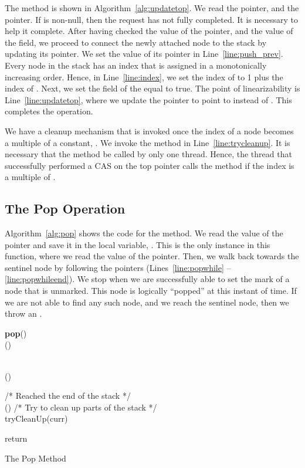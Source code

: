\documentclass{llncs}
\begin{document}
\vspace{-8mm}
\normalsize
The  method is shown in Algorithm~\ref{alg:updatetop}. We read the  pointer, and the  
pointer. If  is non-null, then the request has not fully completed. It is necessary to help it complete. 
After having checked the value of the  pointer, and the value of the  field, we proceed to connect 
the newly attached node to the stack by updating its  pointer. We set the value of its  pointer in 
Line~\ref{line:push_prev}. Every node in the stack has an index that is assigned in a monotonically increasing 
order. Hence, in Line~\ref{line:index}, we set the index of  to 1 plus the index of .
Next, we set the  field 
of the  equal to true. The point of
linearizability is Line~\ref{line:updatetop}, 
where we update the  pointer to point to  instead of
. This completes the  operation. 

We have a cleanup mechanism that is invoked once the index of a node becomes a multiple of a constant, . 
We invoke the  method in Line~\ref{line:trycleanup}. It is necessary that the  method
be called by only one thread.  Hence, the thread that successfully performed a CAS on the top pointer
calls the  method if the index is a multiple of . 

\vspace{-3mm} 
\subsection{The Pop Operation}
Algorithm~\ref{alg:pop} shows the code for the  method. We read the value of 
the  pointer and save it in the local variable, . This is the only instance
in this function, where we read the value of the  pointer. Then, we walk back
towards the sentinel node by following the  pointers (Lines~\ref{line:popwhile} --
\ref{line:popwhileend}). We stop when we are successfully able to set the mark of a node
that is unmarked. This node is logically ``popped'' at this instant of time. 
If we are not able to find any such node, and we reach the sentinel node, then we throw
an . 

\vspace{-6mm}
\begin{algorithm}[!htb]
\scriptsize
\SetAlgoLined

\textbf{pop}(){}\\
	    ()\\ \label{alg:prev_top}
	    \\
	\label{alg:while_mark}
	\While{  }  {  \label{line:popwhile} 
			   ()\\  
			\If{}
			{
				
			}
			   
	} \label{line:popwhileend}

	\If{}
	{
/* Reached the end of the stack */ \\
			  () 
	}
/* Try to clean up parts of the stack */ \\
	tryCleanUp(curr) \label{line:popclean}

	return 
\caption{The Pop Method} \label{alg:pop}
\end{algorithm}
\vspace{-6mm}
\end{document}
